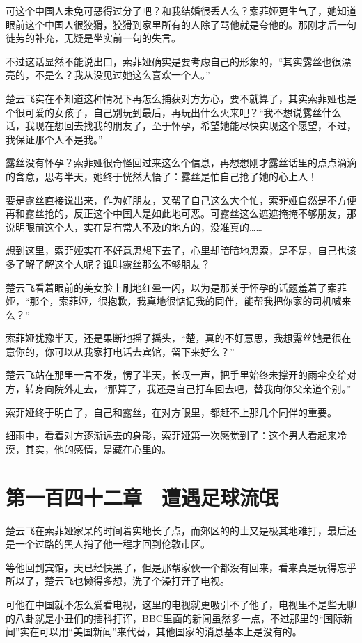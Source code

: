 可这个中国人未免可恶得过分了吧？和我结婚很丢人么？索菲娅更生气了，她知道眼前这个中国人很狡猾，狡猾到家里所有的人除了骂他就是夸他的。那刚才后一句徒劳的补充，无疑是坐实前一句的失言。

不过这话显然不能说出口，索菲娅确实是要考虑自己的形象的，“其实露丝也很漂亮的，不是么？我从没见过她这么喜欢一个人。”

楚云飞实在不知道这种情况下再怎么捕获对方芳心，要不就算了，其实索菲娅也是个很可爱的女孩子，自己别玩到最后，再玩出什么火来吧？“我不想说露丝什么话，我现在想回去找我的朋友了，至于怀孕，希望她能尽快实现这个愿望，不过，我保证那个人不是我。”

露丝没有怀孕？索菲娅很奇怪回过来这么个信息，再想想刚才露丝话里的点点滴滴的含意，思考半天，她终于恍然大悟了：露丝是怕自己抢了她的心上人！

要是露丝直接说出来，作为好朋友，又帮了自己这么大个忙，索菲娅自然是不方便再和露丝抢的，反正这个中国人是如此地可恶。可露丝这么遮遮掩掩不够朋友，那说明眼前这个人，实在是有常人不及的地方的，没准真的……

想到这里，索菲娅实在不好意思想下去了，心里却暗暗地思索，是不是，自己也该多了解了解这个人呢？谁叫露丝那么不够朋友？

楚云飞看着眼前的美女脸上刷地红晕一闪，以为是那关于怀孕的话题羞着了索菲娅，“那个，索菲娅，很抱歉，我真地很惦记我的同伴，能帮我把你家的司机喊来么？”

索菲娅犹豫半天，还是果断地摇了摇头，“楚，真的不好意思，我想露丝她是很在意你的，你可以从我家打电话去宾馆，留下来好么？”

楚云飞站在那里一言不发，愣了半天，长叹一声，把手里始终未撑开的雨伞交给对方，转身向院外走去，“那算了，我还是自己打车回去吧，替我向你父亲道个别。”

索菲娅终于明白了，自己和露丝，在对方眼里，都赶不上那几个同伴的重要。

细雨中，看着对方逐渐远去的身影，索菲娅第一次感觉到了：这个男人看起来冷漠，其实，他的感情，是藏在心里的。

\section{第一百四十二章　遭遇足球流氓}

楚云飞在索菲娅家呆的时间着实地长了点，而郊区的的士又是极其地难打，最后还是一个过路的黑人捎了他一程才回到伦敦市区。

等他回到宾馆，天已经快黑了，但是那帮家伙一个都没有回来，看来真是玩得忘乎所以了，楚云飞也懒得多想，洗了个澡打开了电视。

可他在中国就不怎么爱看电视，这里的电视就更吸引不了他了，电视里不是些无聊的八卦就是小丑们的插科打诨，BBC里面的新闻虽然多一点，不过那里的“国际新闻”实在可以用“美国新闻”来代替，其他国家的消息基本上是没有的。

